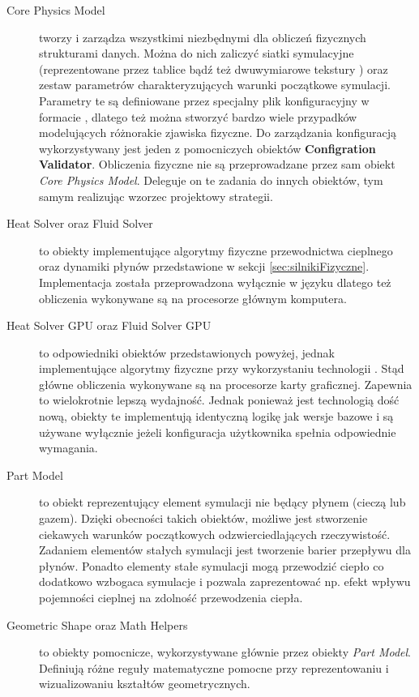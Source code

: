 \begin{description}

\item[Core Physics Model] tworzy i zarządza wszystkimi niezbędnymi dla
obliczeń fizycznych strukturami danych. Można do nich zaliczyć siatki
symulacyjne (reprezentowane przez tablice \js bądź też dwuwymiarowe tekstury
) oraz zestaw parametrów charakteryzujących warunki początkowe
symulacji. Parametry te są definiowane przez specjalny plik konfiguracyjny w
formacie , dlatego też można stworzyć bardzo wiele przypadków
modelujących różnorakie zjawiska fizyczne. Do zarządzania konfiguracją
wykorzystywany jest jeden z pomocniczych obiektów \textbf{Configration
Validator}. Obliczenia fizyczne nie są przeprowadzane przez sam obiekt
\emph{Core Physics Model}. Deleguje on te zadania do innych obiektów, tym
samym realizując wzorzec projektowy strategii.

\item[Heat Solver oraz Fluid Solver] to obiekty implementujące algorytmy
fizyczne przewodnictwa cieplnego oraz dynamiki płynów przedstawione w sekcji
\ref{sec:silnikiFizyczne}. Implementacja została przeprowadzona wyłącznie w
języku \js dlatego też obliczenia wykonywane są na procesorze głównym
komputera.

\item[Heat Solver GPU oraz Fluid Solver GPU] to odpowiedniki obiektów
przedstawionych powyżej, jednak implementujące algorytmy fizyczne przy
wykorzystaniu technologii . Stąd główne obliczenia wykonywane są na
procesorze karty graficznej. Zapewnia to wielokrotnie lepszą wydajność. Jednak
ponieważ  jest technologią dość nową, obiekty te implementują
identyczną logikę jak wersje bazowe i są używane wyłącznie jeżeli konfiguracja
użytkownika spełnia odpowiednie wymagania.

\item[Part Model] to obiekt reprezentujący element symulacji nie będący płynem
(cieczą lub gazem). Dzięki obecności takich obiektów, możliwe jest stworzenie
ciekawych warunków początkowych odzwierciedlających rzeczywistość.  Zadaniem
elementów stałych symulacji jest tworzenie barier przepływu dla płynów. Ponadto
elementy stałe symulacji mogą przewodzić ciepło co dodatkowo wzbogaca symulacje
i pozwala zaprezentować np. efekt wpływu pojemności cieplnej na zdolność
przewodzenia ciepła.

\item[Geometric Shape oraz Math Helpers] to obiekty pomocnicze, wykorzystywane
głównie przez obiekty \emph{Part Model}. Definiują różne reguły matematyczne
pomocne przy reprezentowaniu i wizualizowaniu kształtów geometrycznych.

\end{description}

